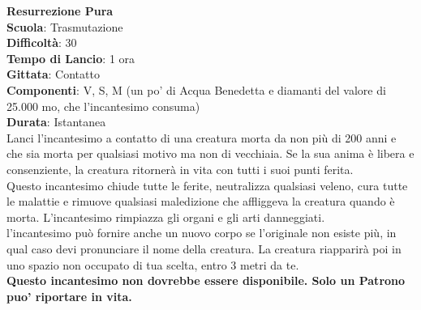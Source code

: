 \begin{multicols}{2}
\medskip\textbf{Resurrezione Pura}\\
\textbf{Scuola}: Trasmutazione\\
\textbf{Difficoltà}: 30\\
\textbf{Tempo di Lancio}: 1 ora\\
\textbf{Gittata}: Contatto\\
\textbf{Componenti}: V, S, M (un po' di Acqua Benedetta e diamanti del valore di 25.000 mo, che l'incantesimo consuma)\\
\textbf{Durata}: Istantanea\\
Lanci l'incantesimo a contatto di una creatura morta da non più di 200 anni e che sia morta per qualsiasi motivo ma non di vecchiaia. Se la sua anima è libera e consenziente, la creatura ritornerà in vita con tutti i suoi punti ferita. \\
Questo incantesimo chiude tutte le ferite, neutralizza qualsiasi veleno, cura tutte le malattie e rimuove qualsiasi maledizione che affliggeva la creatura quando è morta. L'incantesimo rimpiazza gli organi e gli arti danneggiati.\\
l'incantesimo può fornire anche un nuovo corpo se l'originale non esiste più, in qual caso devi pronunciare il nome della creatura. La creatura riapparirà poi in uno spazio non occupato di tua scelta, entro 3 metri da te. \\
\textbf{Questo incantesimo non dovrebbe essere disponibile. Solo un Patrono puo' riportare in vita.}


\end{multicols}
